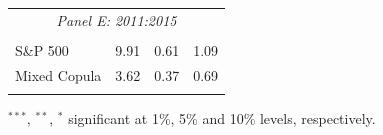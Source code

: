 \documentclass[pdf,10pt,xcolor=dvipsnames,hide notes]{beamer}
\begin{document}
\begin{frame}
\begin{threeparttable}[H]
\begin{tabularx}{\textwidth}{@{\extracolsep{\fill}}llll@{}}
		\multicolumn{4}{c}{\textit{Panel E: 2011:2015}} \\
		&       &       &       \\
		S\&P 500 & 9.91  & 0.61  & 1.09 \\
		Mixed Copula & 3.62  & 0.37  & 0.69 \\
		\multicolumn{1}{r}{} & \multicolumn{1}{r}{} & \multicolumn{1}{r}{} & \multicolumn{1}{r}{} \\
		\bottomrule
	\end{tabularx}%
	\begin{tablenotes}
		\item \scriptsize $^{\ast\ast\ast}$, $^{\ast\ast}$, $^{\ast}$  significant at 1\%, 5\% and 10\% levels, respectively.
	\end{tablenotes}
	\label{tab:table107}%
\end{threeparttable}%

\end{frame}
\end{document}

